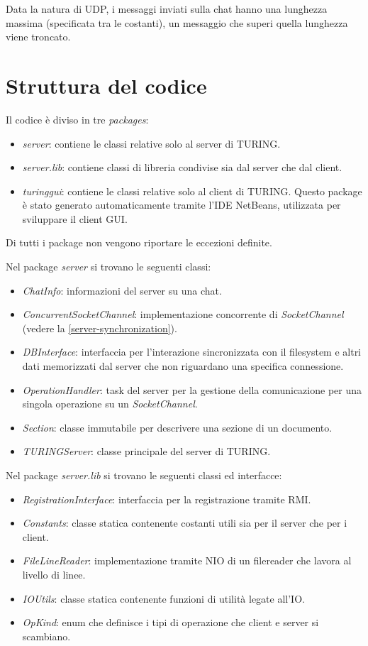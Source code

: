 \documentclass[a4paper]{article}
\theoremstyle{theorem}
\theoremstyle{remark}
\theoremstyle{definition}
\theoremstyle{corollary}
\theoremstyle{lemma}
\begin{document}
Data la natura di UDP, i messaggi inviati sulla chat hanno una lunghezza massima (specificata tra le costanti), un messaggio che superi quella lunghezza viene troncato.


\section{Struttura del codice}
Il codice è diviso in tre \textit{packages}:
\begin{itemize}
	\item \textit{server}: contiene le classi relative solo al server di TURING.
	\item \textit{server.lib}: contiene classi di libreria condivise sia dal server che dal client.
	\item \textit{turinggui}: contiene le classi relative solo al client di TURING. Questo package è stato generato automaticamente tramite l'IDE NetBeans, utilizzata per sviluppare il client GUI.
\end{itemize}

Di tutti i package non vengono riportare le eccezioni definite.

Nel package \textit{server} si trovano le seguenti classi:
\begin{itemize}
	\item \textit{ChatInfo}: informazioni del server su una chat.
	\item \textit{ConcurrentSocketChannel}: implementazione concorrente di \textit{SocketChannel} (vedere la \autoref{server-synchronization}).
	\item \textit{DBInterface}: interfaccia per l'interazione sincronizzata con il filesystem e altri dati memorizzati dal server che non riguardano una specifica connessione.
	\item \textit{OperationHandler}: task del server per la gestione della comunicazione per una singola operazione su un \textit{SocketChannel}.
	\item \textit{Section}: classe immutabile per descrivere una sezione di un documento.
	\item \textit{TURINGServer}: classe principale del server di TURING.
\end{itemize}

Nel package \textit{server.lib} si trovano le seguenti classi ed interfacce:
\begin{itemize}
	\item \textit{RegistrationInterface}: interfaccia per la registrazione tramite RMI.
	\item \textit{Constants}: classe statica contenente costanti utili sia per il server che per i client.
	\item \textit{FileLineReader}: implementazione tramite NIO di un filereader che lavora al livello di linee.
	\item \textit{IOUtils}: classe statica contenente funzioni di utilità legate all'IO.
	\item \textit{OpKind}: enum che definisce i tipi di operazione che client e server si scambiano.
\end{itemize}
\end{document}
